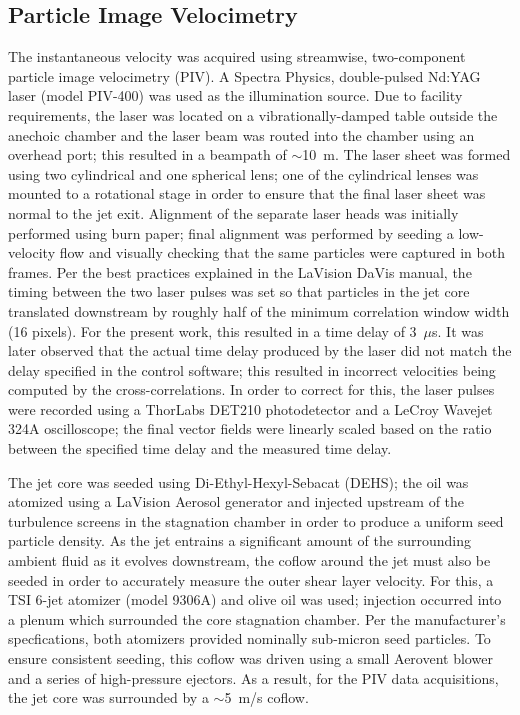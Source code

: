 \subsection{Particle Image Velocimetry}
\label{sect:piv_method}
The instantaneous velocity was acquired using streamwise, two-component particle image velocimetry (PIV). 
A Spectra Physics, double-pulsed Nd:YAG laser (model PIV-400) was used as the illumination source. 
Due to facility requirements, the laser was located on a vibrationally-damped table outside the anechoic chamber and the laser beam was routed into the chamber using an overhead port; this resulted in a beampath of $\sim$10~m. 
The laser sheet was formed using two cylindrical and one spherical lens; one of the cylindrical lenses was mounted to a rotational stage in order to ensure that the final laser sheet was normal to the jet exit.
Alignment of the separate laser heads was initially performed using burn paper; final alignment was performed by seeding a low-velocity flow and visually checking that the same particles were captured in both frames.
Per the best practices explained in the LaVision DaVis manual, the timing between the two laser pulses was set so that particles in the jet core translated downstream by roughly half of the minimum correlation window width (16 pixels).
For the present work, this resulted in a time delay of 3~$\mu$s.
It was later observed that the actual time delay produced by the laser did not match the delay specified in the control software; this resulted in incorrect velocities being computed by the cross-correlations.
In order to correct for this, the laser pulses were recorded using a ThorLabs DET210 photodetector and a LeCroy Wavejet 324A oscilloscope; the final vector fields were linearly scaled based on the ratio between the specified time delay and the measured time delay.

The jet core was seeded using Di-Ethyl-Hexyl-Sebacat (DEHS); the oil was atomized using a LaVision Aerosol generator and injected upstream of the turbulence screens in the stagnation chamber in order to produce a uniform seed particle density.
As the jet entrains a significant amount of the surrounding ambient fluid as it evolves downstream, the coflow around the jet must also be seeded in order to accurately measure the outer shear layer velocity.
For this, a TSI 6-jet atomizer (model 9306A) and olive oil was used; injection occurred into a plenum which surrounded the core stagnation chamber.
Per the manufacturer's specfications, both atomizers provided nominally sub-micron seed particles.
To ensure consistent seeding, this coflow was driven using a small Aerovent blower and a series of high-pressure ejectors. 
As a result, for the PIV data acquisitions, the jet core was surrounded by a $\sim$5~m/s coflow. 

